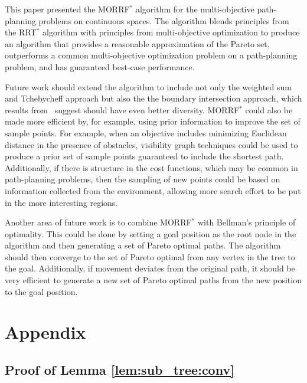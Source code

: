 \documentclass{article}
\begin{document}
This paper presented the MORRF$^{*}$ algorithm for the multi-objective path-planning problems on continuous spaces.
The algorithm blends principles from the RRT$^{*}$ algorithm with principles from multi-objective optimization to produce an algorithm that provides a reasonable approximation of the Pareto set, outperforms a common multi-objective optimization problem on a path-planning problem, and has guaranteed best-case performance.

Future work should extend the algorithm to include not only the weighted sum and Tchebycheff approach but also the the boundary intersection approach, which results from~\cite{4358754} suggest should have even better diversity.
MORRF$^{*}$ could also be made more efficient by, for example, using prior information to improve the set of sample points.
For example, when an objective includes minimizing Euclidean distance in the presence of obstacles, visibility graph techniques could be used to produce a prior set of sample points guaranteed to include the shortest path.
Additionally, if there is structure in the cost functions, which may be common in path-planning problems, then the sampling of new points could be based on information collected from the environment, allowing more search effort to be put in the more interesting regions.

Another area of future work is to combine MORRF$^{*}$ with Bellman's principle of optimality.
This could be done by setting a goal position as the root node in the algorithm and then generating a set of Pareto optimal paths.
The algorithm should then converge to the set of Pareto optimal from any vertex in the tree to the goal.
Additionally, if movement deviates from the original path, it should be very efficient to generate a new set of Pareto optimal paths from the new position to the goal position.





\section{Appendix}

\subsection{Proof of Lemma \ref{lem:sub_tree:conv}}
\end{document}
